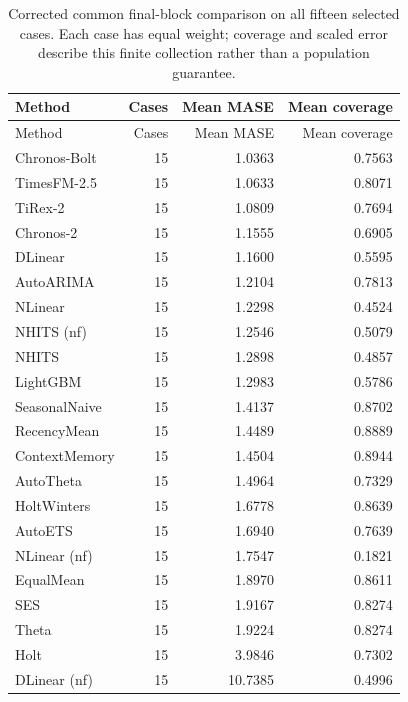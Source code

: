 \begin{longtable}{lrrr}
\caption{Corrected common final-block comparison on all fifteen selected cases. Each case has equal weight; coverage and scaled error describe this finite collection rather than a population guarantee.}\label{tab:archived-results}\\
\toprule Method & Cases & Mean MASE & Mean coverage\\\midrule\endfirsthead
\toprule Method & Cases & Mean MASE & Mean coverage\\\midrule\endhead
Chronos-Bolt & 15 & 1.0363 & 0.7563 \\
TimesFM-2.5 & 15 & 1.0633 & 0.8071 \\
TiRex-2 & 15 & 1.0809 & 0.7694 \\
Chronos-2 & 15 & 1.1555 & 0.6905 \\
DLinear & 15 & 1.1600 & 0.5595 \\
AutoARIMA & 15 & 1.2104 & 0.7813 \\
NLinear & 15 & 1.2298 & 0.4524 \\
NHITS (nf) & 15 & 1.2546 & 0.5079 \\
NHITS & 15 & 1.2898 & 0.4857 \\
LightGBM & 15 & 1.2983 & 0.5786 \\
SeasonalNaive & 15 & 1.4137 & 0.8702 \\
RecencyMean & 15 & 1.4489 & 0.8889 \\
ContextMemory & 15 & 1.4504 & 0.8944 \\
AutoTheta & 15 & 1.4964 & 0.7329 \\
HoltWinters & 15 & 1.6778 & 0.8639 \\
AutoETS & 15 & 1.6940 & 0.7639 \\
NLinear (nf) & 15 & 1.7547 & 0.1821 \\
EqualMean & 15 & 1.8970 & 0.8611 \\
SES & 15 & 1.9167 & 0.8274 \\
Theta & 15 & 1.9224 & 0.8274 \\
Holt & 15 & 3.9846 & 0.7302 \\
DLinear (nf) & 15 & 10.7385 & 0.4996 \\
\bottomrule
\end{longtable}
